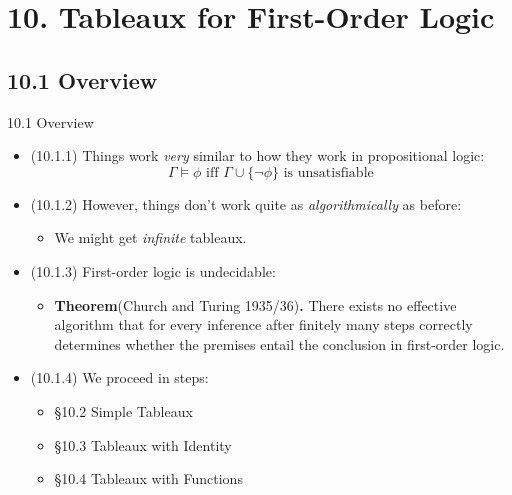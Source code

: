 \section{10. Tableaux for First-Order Logic}
\subsection{10.1 Overview}

\begin{frame}{10.1 Overview}

	\begin{itemize}
		
		\item (10.1.1) Things work \emph{very} similar to how they work in propositional logic:
		\[\Gamma\vDash\phi\text{ iff }\Gamma\cup\{\neg\phi\}\text{ is unsatisfiable}\]

		\item (10.1.2) However, things don't work quite as \emph{algorithmically} as before:
		\begin{itemize}
			
			\item We might get \emph{infinite} tableaux.
		
		\end{itemize}

		\item (10.1.3) First-order logic is undecidable: 
				
		\begin{itemize}
		
			\item \textbf{Theorem}(Church and Turing 1935/36)\textbf{.} There exists no effective algorithm that for every inference after finitely many steps correctly determines whether the premises entail the conclusion in first-order logic.
			
		\end{itemize}
		
		\item (10.1.4) We proceed in steps:
		
			\begin{itemize}
			
				\item \S10.2 Simple Tableaux
				
				\item \S10.3 Tableaux with Identity
				
				\item \S10.4 Tableaux with Functions
			
			\end{itemize}

	\end{itemize}

\end{frame}

